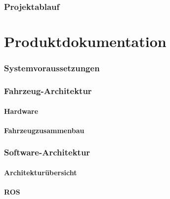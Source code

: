 \documentclass[a4paper, 12pt, titlepage]{scrartcl}
\begin{document}
	\section{Projektablauf} 
	\label{projektablauf}
\newpage
\part{Produktdokumentation}
	\section{Systemvoraussetzungen} 
	\label{systemvoraussetzungen}
	\section{Fahrzeug-Architektur}
	\label{hw_architektur}
		\subsection{Hardware}
		\label{hardware}
		\subsection{Fahrzeugzusammenbau} 
		\label{fahrzeugzusammenbau}
	\section{Software-Architektur}
	\label{sw_architektur}
		\subsection{Architekturübersicht} 
		\label{sw_uebersicht}
		\subsection{ROS}
		\label{ros}
\end{document}
